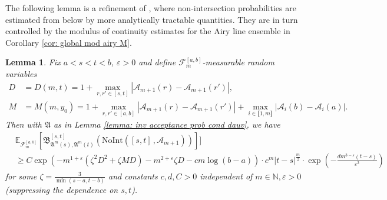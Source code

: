 \documentclass[11pt, reqno]{amsart}
\numberwithin{equation}{section}
\newcounter{dummy} \numberwithin{dummy}{section}
\newtheorem{lemma}[dummy]{Lemma}
\newcommand{\N}{\ensuremath{\mathbb{N}}}
\begin{document}
The following lemma is a refinement of \cite[lemma 3.2]{dauvergne2024wienerdensitiesairyline}, where non-intersection probabilities are estimated from below by more analytically tractable quantities. They are in turn controlled by the modulus of continuity estimates for the Airy line ensemble in Corollary \ref{cor: global mod airy M}.
\begin{lemma}{\cite[Lemma 3.2]{dauvergne2024wienerdensitiesairyline}}
	\label{lemma: acceptance prob LB}
	Fix $a<s<t<b$, $\varepsilon >0 $ and define $\mathscr{F}^{[a, b]}_m$-measurable random variables
	\begin{align*}
	D &= D(m, t)= 1 + \max_{r, r' \in [s, t]} |\mathcal{A}_{m+1}(r) - \mathcal{A}_{m+1}(r')|, \\
M &= M(m, y_0) = 1 + \max_{r, r' \in [a, b]} |\mathcal{A}_{m+1}(r)- \mathcal{A}_{m+1}(r')| + \max_{i \in \llbracket 1, m\rrbracket } |\mathcal{A}_i(b) - \mathcal{A}_i(a)|.
	\end{align*}
	Then with $\mathfrak{A}$ as in Lemma \ref{lemma: inv acceptance prob cond dauv}, we have
	\begin{equation*}
    \begin{array}{ll}
	& \mathbb{E}_{\mathscr{F}^{[a, b]}_m} [\mathfrak{B}^{[s,t]}_{\mathfrak{A}^m(s),\mathfrak{A}^m(t)}(\mathrm{NoInt}([s, t]\,, \mathcal{A}_{m+1}))]]\\
    & \ge C\exp\left(- m^{1+\varepsilon}(\zeta^2D^2 + \zeta MD) - m^{2+\varepsilon} \zeta D - c m\log (b-a) \right) \cdot c^m |t-s|^{\frac{m}{2}}\cdot \exp \left( - \frac{dm^{3-\varepsilon} (t-s)}{\varepsilon^2}\right)
	\end{array}
    \end{equation*}
    for some  $\zeta = \frac{3}{\min(s-a,t-b)}$ and constants $c, d, C>0$ independent of $m\in \N, \varepsilon >0$ (suppressing the dependence on $s, t$).
\end{lemma}
\end{document}
